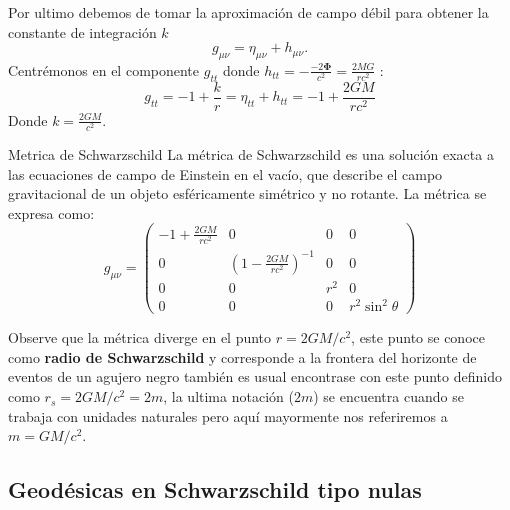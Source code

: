 Por ultimo debemos de tomar la aproximación de campo débil para obtener la constante de integración \( k \) 
\begin{equation}
    g_{\mu \nu} =  \eta_{\mu \nu}+ h_{\mu \nu} .
\end{equation}
Centrémonos en el componente \( g_{tt} \) donde \( h_{tt} = -\frac{-2 \mathbf{\Phi}}{c^2}  = \frac{2MG}{rc^2}\) :
\begin{equation}
    g_{tt} = -1 + \frac{k}{r} = \eta_{tt} + h_{tt} = -1 + \frac{2GM}{rc^2}
\end{equation}
Donde $k = \frac{2GM}{c^2}$.
\begin{definition}{Metrica de Schwarzschild}{}
La métrica de Schwarzschild es una solución exacta a las ecuaciones de campo de Einstein en el vacío, que describe el campo gravitacional de un objeto esféricamente simétrico y no rotante. La métrica se expresa como:
\begin{equation}
    g_{\mu \nu}=\left(\begin{array}{cccc}
                -1+\frac{2 G M}{r c^2} & 0                                       & 0   & 0                  \\
                0                      & \left(1-\frac{2 G M}{r c^2}\right)^{-1} & 0   & 0                  \\
                0                      & 0                                       & r^2 & 0                  \\
                0                      & 0                                       & 0   & r^2 \sin ^2 \theta
            \end{array}\right)
\end{equation}

\begin{note}
    Observe que la métrica  diverge en el punto \( r = 2GM/c^2 \), este punto se conoce como \textbf{radio de Schwarzschild} y corresponde a la frontera del horizonte de eventos de un agujero negro también es usual encontrase con este punto definido como $r_s = 2GM/c^2 =2m $, la ultima notación ($2m$) se encuentra cuando se trabaja con unidades naturales pero aquí mayormente nos referiremos a  $m = GM/c^2$.   
\end{note}  
\end{definition}

\subsection{Geodésicas en Schwarzschild tipo  nulas}

